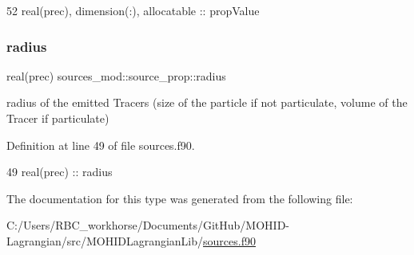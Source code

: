 \begin{DoxyCode}
52         \textcolor{keywordtype}{real(prec)}, \textcolor{keywordtype}{dimension(:)}, \textcolor{keywordtype}{allocatable} :: propValue
\end{DoxyCode}
\mbox{\label{structsources__mod_1_1source__prop_af4cc47a1f8a8d28088150eba368d80a5}} 
\subsubsection{\texorpdfstring{radius}{radius}}
{\footnotesize\ttfamily real(prec) sources\+\_\+mod\+::source\+\_\+prop\+::radius\hspace{0.3cm}{\ttfamily [private]}}



radius of the emitted Tracers (size of the particle if not particulate, volume of the Tracer if particulate) 



Definition at line 49 of file sources.\+f90.


\begin{DoxyCode}
49         \textcolor{keywordtype}{real(prec)} :: radius
\end{DoxyCode}


The documentation for this type was generated from the following file\+:\begin{DoxyCompactItemize}
\item 
C\+:/\+Users/\+R\+B\+C\+\_\+workhorse/\+Documents/\+Git\+Hub/\+M\+O\+H\+I\+D-\/\+Lagrangian/src/\+M\+O\+H\+I\+D\+Lagrangian\+Lib/\mbox{\hyperlink{sources_8f90}{sources.\+f90}}\end{DoxyCompactItemize}
